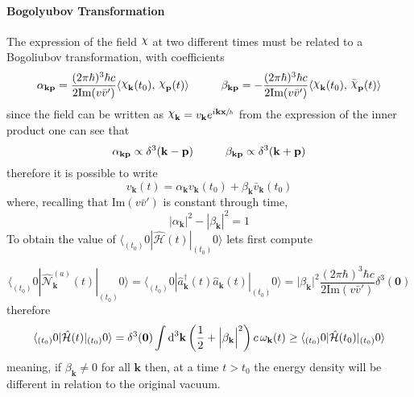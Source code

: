 \paragraph{Bogolyubov Transformation}

The expression of the field $\rchi$ at two different times must be related to a Bogoliubov transformation, with coefficients
\begin{equation}
	\alpha_{\mathbf{kp}}=\frac{(2\pi\hbar)^3\hbar c}{2\text{Im}(v\bar v')}\langle \rchi_\mathbf{k}(t_0),\,\rchi_\mathbf{p}(t)\rangle\hspace{1.0cm}\beta_{\mathbf{kp}}=-\frac{(2\pi\hbar)^3\hbar c}{2\text{Im}(v\bar v')}\langle \rchi_\mathbf{k}(t_0),\,\bar \rchi_\mathbf{p}(t)\rangle
\end{equation}
since the field can be written as $\rchi_\mathbf{k}=v_\mathbf{k}e^{i\mathbf{kx}\sfrac{}{h}}$ from the expression of the inner product one can see that
\begin{equation}
	\alpha_{\mathbf{kp}}\propto \delta^3(\mathbf{k}-\mathbf{p})\hspace{1.0cm}\beta_{\mathbf{kp}}\propto \delta^3(\mathbf{k}+\mathbf{p})
\end{equation}
therefore it is possible to write
\begin{equation}
	v_\mathbf{k}(t)=\alpha_\mathbf{k}v_\mathbf{k}(t_0)+\beta_\mathbf{k}\bar v_\mathbf{k}(t_0)
\end{equation}
where, recalling that $\text{Im}(v\bar v')$ is constant through time, 
\begin{equation}
	|\alpha_\mathbf{k}|^2-|\beta_\mathbf{k}|^2=1
\end{equation}
To obtain the value of $\langle_{(t_0)}0|\hat{\mathcal{H}}(t)|_{(t_0)}0\rangle$ lets first compute


\begin{equation}
	\langle_{(t_0)}0|\hat{\mathcal{N}}_\mathbf{k}^{(a)}(t)|_{(t_0)}0\rangle=\langle_{(t_0)}0|\hat{a}^\dagger_\mathbf{k}(t)\hat{a}_\mathbf{k}(t)|_{(t_0)}0\rangle=\Big|\beta_\mathbf{k}\Big|^2\frac{(2\pi\hbar)^3\hbar c}{2\text{Im}(v\bar v')}\delta^3(\mathbf{0})
\end{equation}
therefore
\begin{equation}
	\langle_{(t_0)}0|\hat{\mathcal{H}}(t)|_{(t_0)}0\rangle=\delta^3(\mathbf{0})\int\text{d}^3\mathbf{k}\left(\frac{1}{2}+\Big|\beta_\mathbf{k}\Big|^2\right)c\,\omega_\mathbf{k}(t)\geq \langle_{(t_0)}0|\hat{\mathcal{H}}(t_0)|_{(t_0)}0\rangle
\end{equation}
meaning, if $\beta_\mathbf{k}\not=0$ for all $\mathbf{k}$ then, at a time $t>t_0$ the energy density will be different in relation to the original vacuum.
